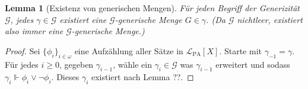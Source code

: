 \documentclass[nofonts]{uebung}
\newtheorem{lemma}[theorem]{Lemma}
\begin{document}
\begin{lemma}[Existenz von generischen Mengen]
    Für jeden Begriff der Generizität $\mathcal G$, jedes $\gamma\in\mathcal G$ existiert eine $\mathcal G$-generische Menge $G\in \gamma$.
    (Da $\mathcal G$ nichtleer, existiert also immer eine $\mathcal G$-generische Menge.)
\end{lemma}
\begin{proof}






    Sei $\{\phi_i\}_{i\in\omega}$ eine Aufzählung aller Sätze in $\mathcal L_{\mathrm{PA}}[X]$. 
    Starte mit $\gamma_{-1}=\gamma$. Für jedes $i\geq 0$, gegeben $\gamma_{i-1}$, wähle ein $\gamma_i\in\mathcal G$ was $\gamma_{i-1}$ erweitert und sodass $\gamma_i \Vdash \phi_i\lor\neg\phi_i$. Dieses $\gamma_i$ existiert nach Lemma ??.


\end{proof}
\end{document}
